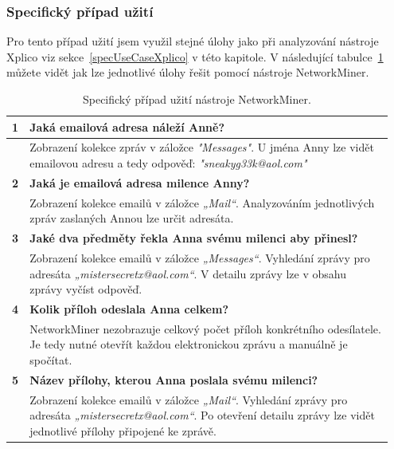         \subsubsection*{Specifický případ užití}
            Pro tento případ užití jsem využil stejné úlohy jako při analyzování nástroje Xplico viz sekce~\ref{specUseCaseXplico} v této kapitole. V následující tabulce~\ref{tab:NetworkMinnerSpecialUseCase} můžete vidět jak lze jednotlivé úlohy řešit pomocí nástroje NetworkMiner.
            
\begin{center}
\begin{table}[ht]
    \centering
    \def\arraystretch{1.5}
    \begin{tabular}{| p{0.02\linewidth} | p{0.93\linewidth} |}
    \hline
        \textbf{1}   & \textbf{Jaká emailová adresa náleží Anně?} \\ \hline
            & Zobrazení kolekce zpráv v záložce \textit{"Messages"}. U jména Anny lze vidět emailovou adresu a tedy odpověď: 
            \textit{"sneakyg33k@aol.com"} \\ \hline
            
        \textbf{2}   & \textbf{Jaká je emailová adresa milence Anny?} \\ \hline
            & Zobrazení kolekce emailů v záložce \textit{„Mail“}. Analyzováním jednotlivých zpráv zaslaných Annou lze určit adresáta. \\ \hline

        \textbf{3}   & \textbf{Jaké dva předměty řekla Anna svému milenci aby přinesl?} \\ \hline
            & Zobrazení kolekce emailů v záložce \textit{„Messages“}. Vyhledání zprávy pro adresáta \textit{„mistersecretx@aol.com“}. V detailu zprávy lze v obsahu zprávy vyčíst odpověď. \\ \hline

        \textbf{4}   & \textbf{ Kolik příloh odeslala Anna celkem?} \\ \hline
            & NetworkMiner nezobrazuje celkový počet příloh konkrétního odesílatele. Je tedy nutné otevřít každou elektronickou zprávu a manuálně je spočítat. \\ \hline

        \textbf{5}   & \textbf{Název přílohy, kterou Anna poslala svému milenci?} \\ \hline
            & Zobrazení kolekce emailů v záložce \textit{„Mail“}. Vyhledání zprávy pro adresáta \textit{„mistersecretx@aol.com“}. Po otevření detailu     zprávy lze vidět jednotlivé přílohy připojené ke zprávě. \\ \hline



    \end{tabular}
    \caption{Specifický případ užití nástroje NetworkMiner.}
    \label{tab:NetworkMinnerSpecialUseCase}
\end{table}
\end{center}

